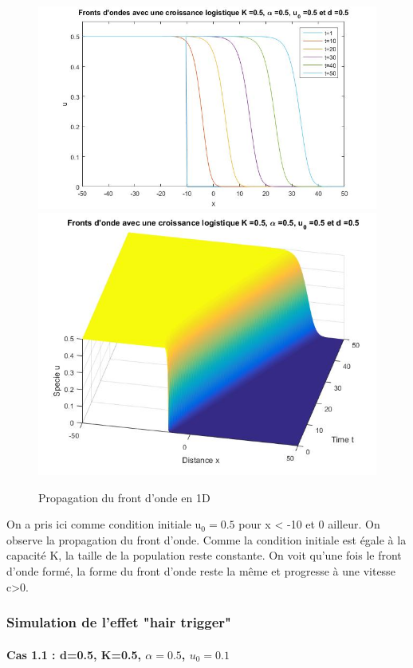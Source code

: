 \documentclass[a4paper,11pt]{article}
\begin{document}
\begin{figure}[H]
	\centering
	\includegraphics[width=0.55\linewidth]{SimulationKPP/figures1/FrontOnde2}\hfill
	\includegraphics[width=0.40\linewidth]{SimulationKPP/figures1/FrontOnde1}\hfill
	\caption{Propagation du front d'onde en 1D}
\end{figure}
\noindent
On a pris ici comme condition initiale u$_0=0.5$ pour x < -10 et 0 ailleur.
On observe la propagation du front d'onde. Comme la condition initiale est égale à la capacité K, la taille de la population reste constante. On voit qu'une fois le front d'onde formé, la forme du front d'onde reste la même et progresse à une vitesse c>0.  

\subsubsection{Simulation de l'effet "hair trigger"}
\paragraph{Cas 1.1 : d=0.5, K=0.5, $\alpha =0.5$, $u_0=0.1$}
\end{document}
